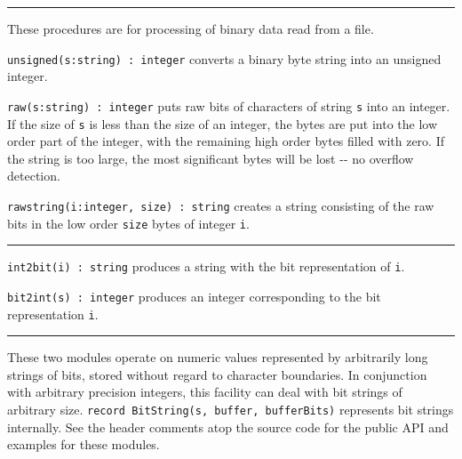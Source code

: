\vspace{0.25cm}\hrule{}

These procedures are for processing of binary data
read from a file.

\texttt{unsigned(s:string) : integer} converts a binary byte string into
an unsigned integer.

\texttt{raw(s:string) : integer} puts raw bits of characters of string
\texttt{s} into an integer. If the size of \texttt{s} is less than the
size of an integer, the bytes are put into the low order part of the
integer, with the remaining high order bytes filled with zero. If the
string is too large, the most significant bytes will be lost -{}- no
overflow detection.

\texttt{rawstring(i:integer, size) : string} creates a string consisting
of the raw bits in the low order \texttt{size} bytes of integer
\texttt{i}.

\vspace{0.25cm}\hrule{}

\texttt{int2bit(i) : string} produces a string with the bit
representation of \texttt{i}.

\texttt{bit2int(s) : integer} produces an integer corresponding to the
bit representation \texttt{i}. 

\vspace{0.25cm}\hrule{}

These two modules operate on numeric values represented by
arbitrarily long strings of bits, stored without regard to character
boundaries. In conjunction with arbitrary precision integers, this
facility can deal with bit strings of arbitrary size.
\texttt{record BitString(s, buffer, bufferBits)} represents bit
strings internally.
See the header comments atop the source code for the public API and examples
for these modules.



